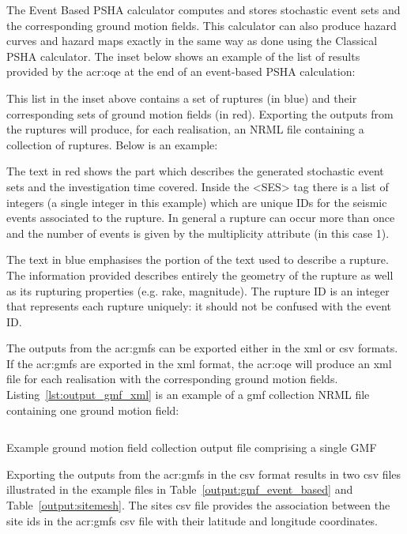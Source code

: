 The Event Based PSHA calculator computes and stores stochastic event sets and
the corresponding ground motion fields. This calculator can also produce
hazard curves and hazard maps exactly in the same way as done using the
Classical PSHA calculator. The inset below shows an example of the list of
results provided by the \gls{acr:oqe} at the end of an event-based PSHA
calculation:



This list in the inset above contains a set of ruptures (in blue) and their
corresponding sets of ground motion fields (in red). Exporting the outputs
from the ruptures will produce, for each realisation, an NRML file containing
a collection of ruptures. Below is an example:



The text in red shows the part which describes the generated
stochastic event sets and the investigation time covered. Inside the
<SES> tag there is a list of integers (a single integer in this example)
which are unique IDs for the seismic events associated to the rupture.
In general a rupture can occur more than once and the number of events
is given by the multiplicity attribute (in this case 1).

The text in blue emphasises the portion of the text used to describe a
rupture. The information provided describes entirely the geometry of the
rupture as well as its rupturing properties (e.g. rake, magnitude). The
rupture ID is an integer that represents each rupture uniquely: it should
not be confused with the event ID.

The outputs from the \glspl{acr:gmf} can be exported either in the xml or csv
formats. If the \glspl{acr:gmf} are exported in the xml format, the
\gls{acr:oqe} will produce an xml file for each realisation with the
corresponding ground motion fields. Listing~\ref{lst:output_gmf_xml} is an
example of a gmf collection NRML file containing one ground motion field:

\begin{listing}[htbp]
  \inputminted[firstline=1,firstnumber=1,fontsize=\footnotesize,frame=single,linenos,bgcolor=lightgray]{xml}{oqum/hazard/verbatim/output_gmf.xml}
  \caption{Example ground motion field collection output file comprising a single GMF}
  \label{lst:output_gmf_xml}
\end{listing}

Exporting the outputs from the \glspl{acr:gmf} in the csv format results in
two csv files illustrated in the example files in
Table~\ref{output:gmf_event_based} and Table~\ref{output:sitemesh}. The sites csv
file provides the association between the site ids in the \glspl{acr:gmf} csv
file with their latitude and longitude coordinates.

